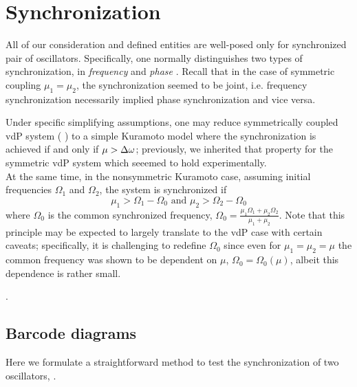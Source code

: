 \documentclass{mynotes}
\begin{document}
\section{ Synchronization }

All of our consideration and defined entities are well-posed only for synchronized pair of oscillators. Specifically, one normally distinguishes two types of synchronization, in \emph{ frequency } and \emph{ phase }. Recall that in the case of symmetric coupling \( \mu_1 = \mu_2 \), the synchronization seemed to be joint, i.e. frequency synchronization necessarily implied phase synchronization and vice versa.

\begin{remark}\label{rem:kuramoto_synch}
      Under specific simplifying assumptions, one may reduce symmetrically coupled vdP system (  ) to a simple Kuramoto model where the synchronization is achieved if and only if \( \mu > \Delta\omega \); previously, we inherited that property for the symmetric vdP system which seeemed to hold experimentally.
      \\[5pt]

      At the same time, in the nonsymmetric Kuramoto case, assuming initial frequencies \( \Omega_1 \) and \( \Omega_2 \), the system is synchronized if \[ \mu_1 > \Omega_1 - \Omega_0  \text{ and } \mu_2 > \Omega_2 - \Omega_0 \] where \( \Omega_0 \) is the common synchronized frequency, \( \Omega_0 = \frac{ \mu_1 \Omega_1 + \mu_2 \Omega_2 }{ \mu_1 + \mu_2 } \). Note that this principle may be expected to largely translate to the vdP case with certain caveats; specifically, it is challenging to redefine \( \Omega_0 \) since even for \( \mu_1 = \mu_2 = \mu \) the common frequency was shown to be dependent on \( \mu \), \( \Omega_0 = \Omega_0 ( \mu ) \), albeit this dependence is rather small.
\end{remark}
.


\subsection{Barcode diagrams}

Here we formulate a straightforward method to test the synchronization of two oscillators, . 
\end{document}

